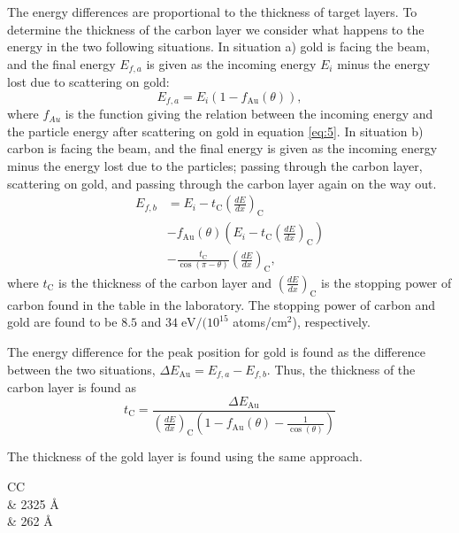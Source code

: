 The energy differences are proportional to the thickness of target layers. To determine the thickness of the carbon layer we consider what happens to the energy in the two following situations. In situation a) gold is facing the beam, and the final energy $E_{f,a}$ is given as the incoming energy $E_i$ minus the energy lost due to scattering on gold:
\begin{equation*}
E_{f,a} = E_i (1-f_\mathrm{Au}(\theta)), 
\end{equation*}
where $f_{Au}$ is the function giving the relation between the incoming energy and the particle energy after scattering on gold in equation \cref{eq:5}. 
In situation b) carbon is facing the beam, and the final energy is given as the incoming energy minus the energy lost due to the particles; passing through the carbon layer, scattering on gold, and passing through the carbon layer again on the way out. 
\begin{align*}
E_{f,b} &= E_i - t_\mathrm{C} \left(\frac{dE}{dx}\right)_\mathrm{C} 
\\ &- f_\mathrm{Au}(\theta) \left(E_i - t_\mathrm{C} \left(\frac{dE}{dx}\right)_\mathrm{C} \right) \\ &- \frac{t_\mathrm{C}}{\cos(\pi-\theta)} \left(\frac{dE}{dx}\right)_\mathrm{C}, 
\end{align*}
where $t_\mathrm{C}$ is the thickness of the carbon layer and $\left(\frac{dE}{dx}\right)_\mathrm{C}$ is the stopping power of carbon found in the table in the laboratory. The stopping power of carbon and gold are found to be $8.5$ and $34 \; \si{\electronvolt}/(10^{15}$ atoms/$\si{\centi\metre}^2$), respectively.

The energy difference for the peak position for gold is found as the difference between the two situations, $\Delta E_\mathrm{Au} = E_{f,a} - E_{f,b}$. Thus, the thickness of the carbon layer is found as 
\begin{equation}
t_\mathrm{C} = \frac{\Delta E_{\mathrm{Au}}}{\left(\frac{dE}{dx}\right)_\mathrm{C} \left(1 - f_\mathrm{Au}(\theta) - \frac{1}{\cos(\theta)} \right)}
\end{equation}


The thickness of the gold layer is found using the same approach. 

\begin{table}[h]
\centering
\caption{Thickness of the target layers determined from change in energy.}
\begin{tabular}{CC}
\toprule
{}\\
\midrule
{} & 2325  \; \AA \\
 & 262  \; \AA \\
\bottomrule
\end{tabular}

\label{tab_thickness}
\end{table}

